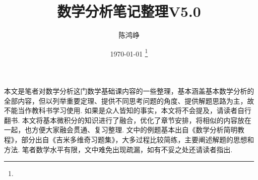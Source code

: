\documentclass[11pt,UTF8]{ctexart}
\title{数学分析笔记整理V5.0}
\author{陈鸿峥}
\date{{\builddatemonth\today} \footnote{\text{Build \builddate\today}}}%
\renewcommand{\thefootnote}{\fnsymbol{footnote}}
\begin{document}
\maketitle
\renewcommand{\thefootnote}{\arabic{footnote}}
\setcounter{footnote}{0}

\setcounter{tocdepth}{2}%
\tableofcontents
\bigskip\bigskip\bigskip

\par 本文是笔者对数学分析这门数学基础课内容的一些整理，基本涵盖基本数学分析的全部内容，但以列举重要定理、提供不同思考问题的角度、提供解题思路为主，故不能当作教科书学习使用. 如果是众人皆知的事实，本文将不会提及，请读者自行翻书. 本文将基本微积分的知识进行了融合，优化了章节安排，将相似的内容放在一起，也方便大家融会贯通、复习整理. 文中的例题基本出自《数学分析简明教程》，部分出自《吉米多维奇习题集》，大多过程比较简练，主要阐述解题的思想和方法. 笔者数学水平有限，文中难免出现疏漏，如有不妥之处还请读者指出.


















\end{document}

